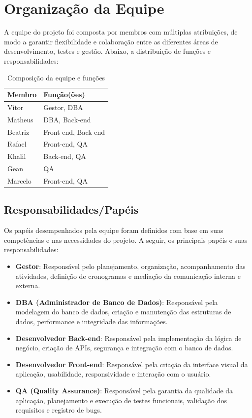 \documentclass[
	12pt,				%
	openany,			%
	twoside,			%
	a4paper,			%
	english,			%
	brazil				%
	]{abntex2}
\begin{document}
\section{Organização da Equipe}

A equipe do projeto foi composta por membros com múltiplas atribuições, de modo a garantir flexibilidade e colaboração entre as diferentes áreas de desenvolvimento, testes e gestão. Abaixo, a distribuição de funções e responsabilidades:

\begin{table}[htbp] 
\centering
\begin{tabular}{|l|l|}
\hline
\textbf{Membro} & \textbf{Função(ões)} \\ \hline
Vitor           & Gestor, DBA           \\ \hline
Matheus         & DBA, Back-end         \\ \hline
Beatriz         & Front-end, Back-end   \\ \hline
Rafael          & Front-end, QA         \\ \hline
Khalil              & Back-end, QA          \\ \hline
Gean            & QA                    \\ \hline
Marcelo         & Front-end, QA         \\ \hline
\end{tabular}
\caption{Composição da equipe e funções}
\end{table}


\subsection{Responsabilidades/Papéis}

Os papéis desempenhados pela equipe foram definidos com base em suas competências e nas necessidades do projeto. A seguir, os principais papéis e suas responsabilidades:

\begin{itemize}
    \item \textbf{Gestor}: Responsável pelo planejamento, organização, acompanhamento das atividades, definição de cronogramas e mediação da comunicação interna e externa.
    \item \textbf{DBA (Administrador de Banco de Dados)}: Responsável pela modelagem do banco de dados, criação e manutenção das estruturas de dados, performance e integridade das informações.
    \item \textbf{Desenvolvedor Back-end}: Responsável pela implementação da lógica de negócio, criação de APIs, segurança e integração com o banco de dados.
    \item \textbf{Desenvolvedor Front-end}: Responsável pela criação da interface visual da aplicação, usabilidade, responsividade e interação com o usuário.
    \item \textbf{QA (Quality Assurance)}: Responsável pela garantia da qualidade da aplicação, planejamento e execução de testes funcionais, validação dos requisitos e registro de bugs.
\end{itemize}
\end{document}

